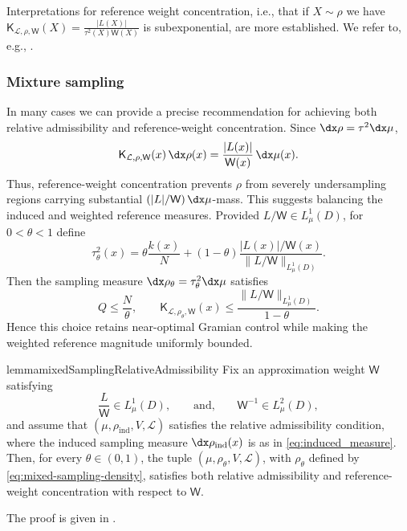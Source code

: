 \documentclass[10pt,dvipsnames]{amsart}
\begin{document}
Interpretations for reference weight concentration, i.e., that if $X \sim \rho$ we have \(\mathsf K_{\mathcal L,\rho,\mathsf W}(X)
    =
    \frac{|L(X)|}{\tau^2(X)\mathsf W(X)}\) is subexponential, are more established. We refer to, e.g., \cite[Section 2.7]{vershynin2019high}.


\subsubsection{Mixture sampling}
\label{sssec:mixture-sampling}

In many cases we can provide a precise recommendation for achieving both
relative admissibility and reference-weight concentration. Since
\(\dx\rho=\tau^2\dx\mu\),
\[
    \mathsf K_{\mathcal L,\rho,\mathsf W}(x)\,\dx\rho(x)
    =
    \frac{|L(x)|}{\mathsf W(x)}\,\dx\mu(x).
\]
Thus, reference-weight concentration prevents \(\rho\) from severely
undersampling regions carrying substantial
\((|L|/\mathsf W)\,\dx\mu\)-mass. This suggests balancing the induced and
weighted reference measures. Provided
\(L/\mathsf W\in L^1_\mu(D)\), for \(0<\theta<1\) define
\begin{equation}
\label{eq:mixed-sampling-density}
    \tau_\theta^2(x)
    =
    \theta\frac{k(x)}{N}
    +
    (1-\theta)
    \frac{|L(x)|/\mathsf W(x)}
    {\|L/\mathsf W\|_{L^1_\mu(D)}}.
\end{equation}
Then the sampling measure
\(\dx\rho_\theta=\tau_\theta^2\dx\mu\) satisfies
\[
    Q\leq\frac{N}{\theta},
    \qquad
    \mathsf K_{\mathcal L,\rho_\theta,\mathsf W}(x)
    \leq
    \frac{\|L/\mathsf W\|_{L^1_\mu(D)}}{1-\theta}.
\]
Hence this choice retains near-optimal Gramian control while making the
weighted reference magnitude uniformly bounded.

\begin{restatable}{lemma}{mixedSamplingRelativeAdmissibility}
\label{lemma:mixed-sampling-relative-admissibility}
Fix an approximation weight \(\mathsf W\) satisfying
\[
    \frac{L}{\mathsf W} \in L^1_\mu(D),\qquad\text{and,}\qquad
    \mathsf W^{-1}\in L^2_\mu(D),
\]
and assume that
\((\mu,\rho_{\mathrm{ind}},V,\mathcal L)\) satisfies the relative
admissibility condition, where the induced sampling measure \(\dx\rho_{\mathrm{ind}}(x)\) is as in \eqref{eq:induced_measure}. Then, for every \(\theta\in(0,1)\), the tuple
\((\mu,\rho_\theta,V,\mathcal L)\), with \(\rho_\theta\) defined by
\eqref{eq:mixed-sampling-density}, satisfies both relative admissibility and
reference-weight concentration with respect to \(\mathsf W\).
\end{restatable}
\noindent The proof is given in .
\end{document}

